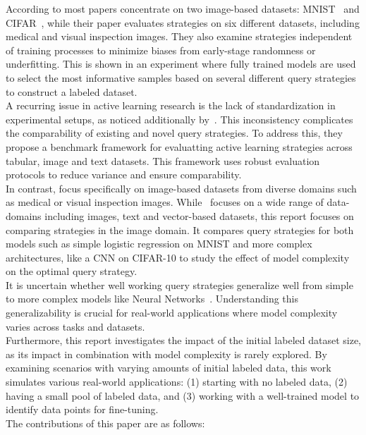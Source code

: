 \documentclass{article}
\theoremstyle{plain}
\theoremstyle{definition}
\theoremstyle{remark}
\begin{document}
According to \cite{ueno_benchmarkingofquerystrategies} most papers concentrate on two image-based datasets: MNIST~\cite{mnist} and CIFAR~\cite{cifar}, while their paper evaluates strategies on six different datasets, including medical and visual inspection images. They also examine strategies independent of training processes to minimize biases from early-stage randomness or underfitting. This is shown in an experiment where fully trained models are used to select the most informative samples based on several different query strategies to construct a labeled dataset. \\ 
A recurring issue in active learning research is the lack of standardization in experimental setups, as noticed additionally by~\cite{werner_comparableactivelearning}. This inconsistency complicates the comparability of existing and novel query strategies. To address this, they propose a benchmark framework for evaluatting active learning strategies across tabular, image and text datasets. This framework uses robust evaluation protocols to reduce variance and ensure comparability. \\
In contrast, \cite{ueno_benchmarkingofquerystrategies} focus specifically on image-based datasets from diverse domains such as medical or visual inspection images. While~\cite{werner_comparableactivelearning} focuses on a wide range of data-domains including images, text and vector-based datasets, this report focuses on comparing strategies in the image domain. 
It compares query strategies for both models such as simple logistic regression on MNIST and more complex architectures, like a CNN on CIFAR-10 to study the effect of model complexity on the optimal query strategy. \\
It is uncertain whether well working query strategies generalize well from simple to more complex models like Neural Networks~\cite{schröder_surveyactivelearningtext}. Understanding this generalizability is crucial for real-world applications where model complexity varies across tasks and datasets. \\
Furthermore, this report investigates the impact of the initial labeled dataset size, as its impact in combination with model complexity is rarely explored. 
By examining scenarios with varying amounts of initial labeled data, this work simulates various real-world applications: (1) starting with no labeled data, (2) having a small pool of labeled data, and (3) working with a well-trained model to identify data points for fine-tuning.
\\
The contributions of this paper are as follows:
\end{document}
